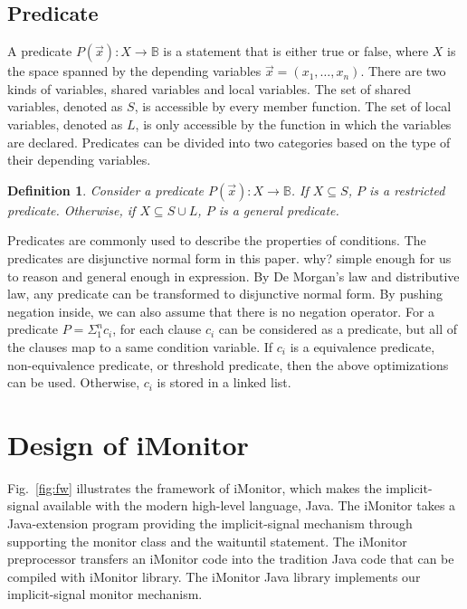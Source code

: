 \documentclass[preprint]{sigplanconf}
\newtheorem{definition}{Definition}
\begin{document}
\subsection{Predicate}
A predicate $P(\vec{x}): X \rightarrow \mathbb{B}$ is a statement that is 
either true or false, where $X$ is the space spanned by the depending variables 
$\vec{x}=(x_1, \dots, x_n)$. There are two kinds of
variables, shared variables and local variables. The set of shared variables, 
denoted as $S$, is accessible by every member function. The set of local 
variables, denoted as $L$, is only accessible by the function in which the
variables are declared. 
Predicates can be divided into two categories based on the type of their 
depending variables.
\begin{definition}
    Consider a predicate $P(\vec{x}): X \rightarrow \mathbb{B}$. If $X 
    \subseteq S$, $P$ 
    is a restricted predicate. Otherwise, if $X \subseteq S \cup L$, $P$ 
    is a general predicate. 
\end{definition}

Predicates are commonly used to describe the properties of conditions. The
predicates are disjunctive normal form in this paper. why? simple enough for us
to reason and general enough in expression. 
By De Morgan's law and distributive law, any predicate can be transformed to
disjunctive normal form. By pushing negation inside, we can also assume 
that there is no negation operator. For a predicate $P = \Sigma_{1}^{n}c_i$, 
for each clause $c_i$ can be considered as a predicate, but all of the clauses 
map to a same condition variable. If $c_i$ is a equivalence predicate, 
non-equivalence predicate, or threshold predicate, then the above optimizations
can be used. Otherwise, $c_i$ is stored in a linked list. 



\section{Design of iMonitor} \label{sec:fw}
Fig.~\ref{fig:fw} illustrates the framework of iMonitor, which makes 
the implicit-signal available with the modern high-level language, Java. 
The iMonitor takes a Java-extension program providing the implicit-signal 
mechanism through supporting the monitor class and the waituntil statement. The 
iMonitor preprocessor transfers an iMonitor code into the tradition Java code 
that can be compiled with iMonitor library. The iMonitor 
Java library implements our implicit-signal monitor mechanism.  
\end{document}
